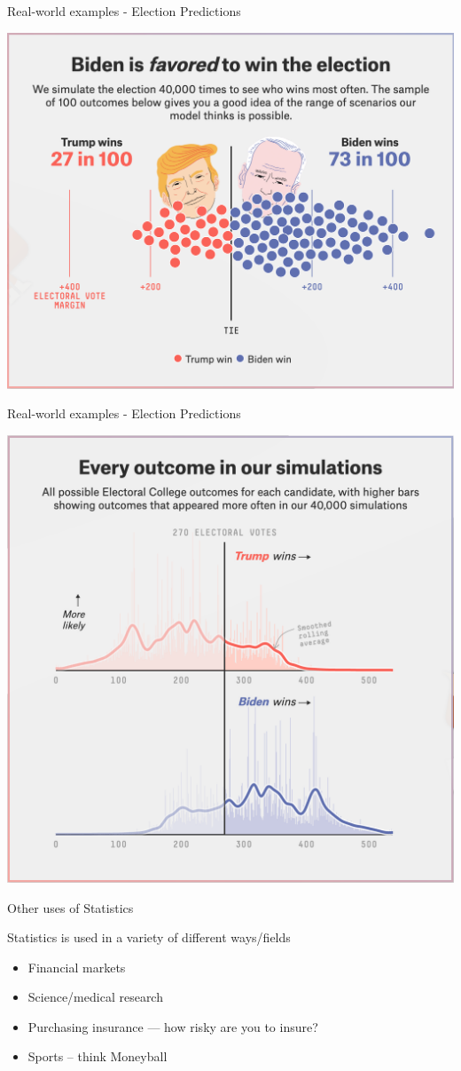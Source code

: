 \documentclass{beamer}
\begin{document}
\begin{frame}{Real-world examples - Election Predictions}
    \begin{center}
        \includegraphics[width=0.9\linewidth]{538_2.png}
    \end{center}
\end{frame}

\begin{frame}{Real-world examples - Election Predictions}
    \begin{center}
        \includegraphics[width=0.75\linewidth]{538_3.png}
    \end{center}
\end{frame}

\begin{frame}{Other uses of Statistics}
	
	Statistics is used in a variety of different ways/fields
	\begin{itemize}
		\item Financial markets
		\item Science/medical research
		\item Purchasing insurance --- how risky are you to insure?
		\item Sports -- think Moneyball
	\end{itemize}
	
\end{frame}
\end{document}
